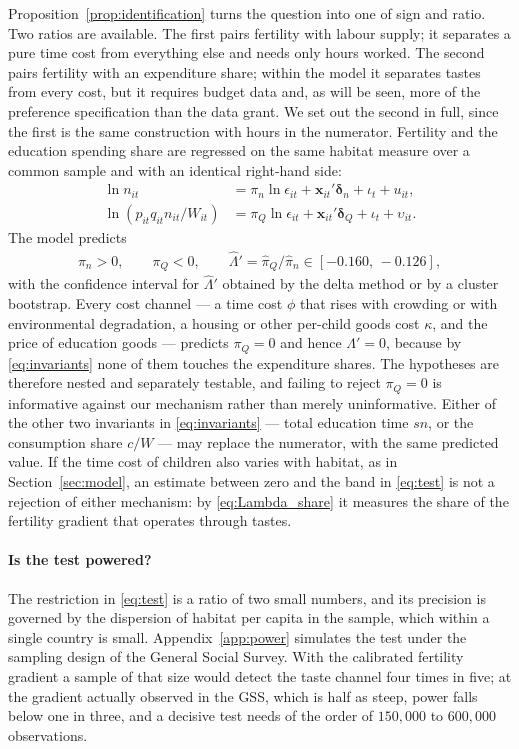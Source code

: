 \documentclass[11pt]{article}
\begin{document}
Proposition~\ref{prop:identification} turns the question into one of sign and ratio. Two ratios
are available. The first pairs fertility with labour supply; it separates a pure time cost from
everything else and needs only hours worked. The second pairs fertility with an expenditure share;
within the model it separates tastes from every cost, but it requires budget data and, as will be
seen, more of the preference specification than the data grant. We set out the second in full,
since the first is the same construction with hours in the numerator. Fertility and the education
spending share are regressed on the same habitat measure over a common sample and with an
identical right-hand side:
\begin{align}
\ln n_{it} &= \pi_n \ln \epsilon_{it} + \mathbf{x}_{it}'\boldsymbol{\delta}_n+\iota_t+u_{it},
\label{eq:pair_n}\\
\ln\!\left(p_{it}q_{it}n_{it}/W_{it}\right) &= \pi_{Q}\ln \epsilon_{it}
  + \mathbf{x}_{it}'\boldsymbol{\delta}_{Q}+\iota_t+\upsilon_{it}.
\label{eq:pair_q}
\end{align}
The model predicts
\begin{align}
\pi_n>0,
\qquad
\pi_{Q}<0,
\qquad
\widehat\Lambda'=\hat\pi_{Q}/\hat\pi_n\in[-0.160,\,-0.126],
\label{eq:test}
\end{align}
with the confidence interval for $\widehat\Lambda'$ obtained by the delta method or by a cluster
bootstrap. Every cost channel --- a time cost $\phi$ that rises with crowding \citep{DAO2013442,dao25} or with environmental
degradation, a housing or other per-child goods cost $\kappa$, and the price of education goods
--- predicts $\pi_{Q}=0$ and hence $\Lambda'=0$, because by \eqref{eq:invariants} none of them
touches the expenditure shares. The hypotheses are therefore nested and separately testable, and
failing to reject $\pi_{Q}=0$ is informative against our mechanism rather than merely
uninformative. Either of the other two invariants in \eqref{eq:invariants} --- total education time
$sn$, or the consumption share $c/W$ --- may replace the numerator, with the same predicted value.
If the time cost of children also varies with habitat, as in Section~\ref{sec:model}, an
estimate between zero and the band in \eqref{eq:test} is not a rejection of either mechanism: by
\eqref{eq:Lambda_share} it measures the share of the fertility gradient that operates through
tastes.

\paragraph{Is the test powered?}
The restriction in \eqref{eq:test} is a ratio of two small numbers, and its precision is governed by
the dispersion of habitat per capita in the sample, which within a single country is small.
Appendix~\ref{app:power} simulates the test under the sampling design of the General Social Survey.
With the calibrated fertility gradient a sample of that size would detect the taste channel four times
in five; at the gradient actually observed in the GSS, which is half as steep, power falls below one in
three, and a decisive test needs of the order of $150{,}000$ to $600{,}000$ observations.
\end{document}
